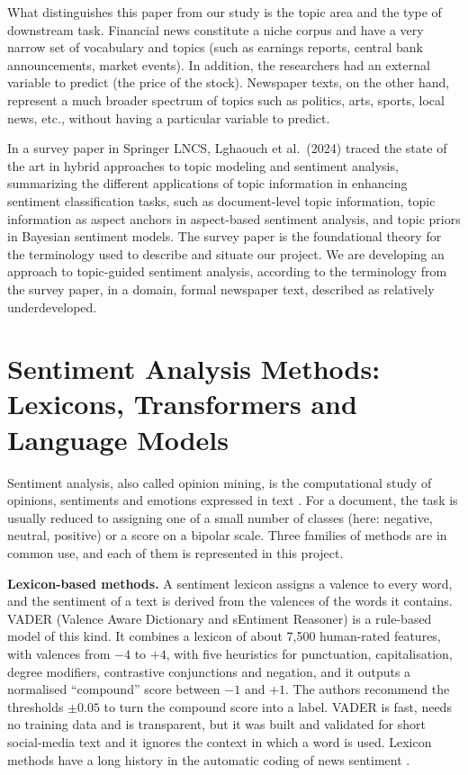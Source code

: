 What distinguishes this paper from our study is the topic area and the type of downstream task. Financial news constitute a niche corpus and have a very narrow set of vocabulary and topics (such as earnings reports, central bank announcements, market events). In addition, the researchers had an external variable to predict (the price of the stock). Newspaper texts, on the other hand, represent a much broader spectrum of topics such as politics, arts, sports, local news, etc., without having a particular variable to predict.

In a survey paper in Springer LNCS, Lghaouch et al.\ (2024) \cite{lghaouch2024} traced the state of the art in hybrid approaches to topic modeling and sentiment analysis, summarizing the different applications of topic information in enhancing sentiment classification tasks, such as document-level topic information, topic information as aspect anchors in aspect-based sentiment analysis, and topic priors in Bayesian sentiment models. The survey paper is the foundational theory for the terminology used to describe and situate our project. We are developing an approach to topic-guided sentiment analysis, according to the terminology from the survey paper, in a domain, formal newspaper text, described as relatively underdeveloped.

\section{Sentiment Analysis Methods: Lexicons, Transformers and Language Models}

Sentiment analysis, also called opinion mining, is the computational study of opinions, sentiments and emotions expressed in text \cite{pang2008,liu2012}. For a document, the task is usually reduced to assigning one of a small number of classes (here: negative, neutral, positive) or a score on a bipolar scale. Three families of methods are in common use, and each of them is represented in this project.

\noindent\textbf{Lexicon-based methods.} A sentiment lexicon assigns a valence to every word, and the sentiment of a text is derived from the valences of the words it contains. VADER (Valence Aware Dictionary and sEntiment Reasoner) \cite{hutto2014} is a rule-based model of this kind. It combines a lexicon of about 7,500 human-rated features, with valences from $-4$ to $+4$, with five heuristics for punctuation, capitalisation, degree modifiers, contrastive conjunctions and negation, and it outputs a normalised ``compound'' score between $-1$ and $+1$. The authors recommend the thresholds $\pm 0.05$ to turn the compound score into a label. VADER is fast, needs no training data and is transparent, but it was built and validated for short social-media text and it ignores the context in which a word is used. Lexicon methods have a long history in the automatic coding of news sentiment \cite{young2012,soroka2015bad}.

